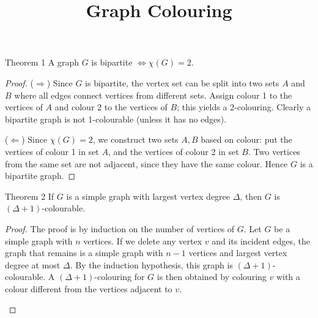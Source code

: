 \documentclass[11pt]{scrartcl}
\title{\color{accentblue}Graph Colouring}
\author{}
\date{}
\theoremstyle{plain}
\theoremstyle{remark}
\begin{document}
\maketitle

\begin{thmbox}{Theorem 1}
A graph $G$ is bipartite $\iff \chi(G) = 2$.
\end{thmbox}

\begin{proof}
($\Rightarrow$) Since $G$ is bipartite, the vertex set can be split into two sets $A$ and $B$ where all edges connect vertices from different sets. Assign colour 1 to the vertices of $A$ and colour 2 to the vertices of $B$; this yields a 2-colouring. Clearly a bipartite graph is not 1-colourable (unless it has no edges).

\medskip
($\Leftarrow$) Since $\chi(G) = 2$, we construct two sets $A, B$ based on colour: put the vertices of colour 1 in set $A$, and the vertices of colour 2 in set $B$. Two vertices from the same set are not adjacent, since they have the same colour. Hence $G$ is a bipartite graph.
\end{proof}

\begin{thmbox}{Theorem 2}
If $G$ is a simple graph with largest vertex degree $\Delta$, then $G$ is $(\Delta+1)$-colourable.
\end{thmbox}

\begin{proof}
The proof is by induction on the number of vertices of $G$. Let $G$ be a simple graph with $n$ vertices. If we delete any vertex $v$ and its incident edges, the graph that remains is a simple graph with $n-1$ vertices and largest vertex degree at most $\Delta$. By the induction hypothesis, this graph is $(\Delta+1)$-colourable. A $(\Delta+1)$-colouring for $G$ is then obtained by colouring $v$ with a colour different from the vertices adjacent to $v$.

\begin{center}
\end{center}
\end{proof}
\end{document}
